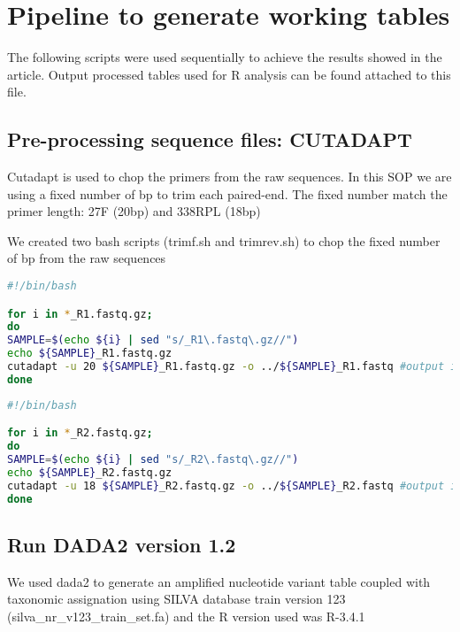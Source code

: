 \documentclass{article}
\begin{document}
\section{Pipeline to generate working tables}
The following scripts were used sequentially to achieve the results showed in the article. Output processed tables used for R analysis can be found attached to this file. 
\subsection{Pre-processing sequence files: CUTADAPT}
Cutadapt is used to chop the primers from the raw sequences. In this SOP we are using a fixed number of bp to trim each paired-end. The fixed number match the primer length: 27F (20bp) and 338RPL (18bp)

We created two bash scripts (trimf.sh and trimrev.sh) to chop the fixed number of bp from the raw sequences

\begin{lstlisting}[language=bash,caption={trimf.sh}]
#!/bin/bash

for i in *_R1.fastq.gz;
do
SAMPLE=$(echo ${i} | sed "s/_R1\.fastq\.gz//") 
echo ${SAMPLE}_R1.fastq.gz 
cutadapt -u 20 ${SAMPLE}_R1.fastq.gz -o ../${SAMPLE}_R1.fastq #output is redirected to the higher class directory. Scripts can be modified to direct the output to a specific directory created by the user.
done
\end{lstlisting}
\begin{lstlisting}[language=bash,caption={trimrev.sh}]
#!/bin/bash

for i in *_R2.fastq.gz;
do
SAMPLE=$(echo ${i} | sed "s/_R2\.fastq\.gz//") 
echo ${SAMPLE}_R2.fastq.gz
cutadapt -u 18 ${SAMPLE}_R2.fastq.gz -o ../${SAMPLE}_R2.fastq #output is redirected to the higher class directory. Scripts can be modified to direct the output to a specific directory created by the user.
done
\end{lstlisting}

\subsection{Run DADA2 version 1.2}

We used dada2 to generate an amplified nucleotide variant table coupled with taxonomic assignation using SILVA database train version 123 (silva\_nr\_v123\_train\_set.fa) and the R version used was R-3.4.1
\end{document}
